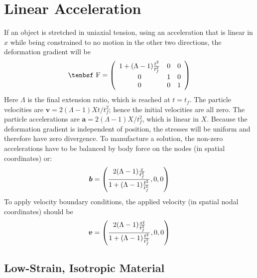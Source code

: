 \documentclass[11pt]{book}
\renewcommand{\vec}[1]{\boldsymbol{#1}}
\def\F{\hbox{\tenbsf F}}
\begin{document}
\section{Linear Acceleration}

If an object is stretched in uniaxial tension, using an acceleration that is linear in $x$ while being constrained to no motion in the other two directions, the deformation gradient will be
\begin{equation}
    \F = \left(\begin{array}{ccc} 1 + (\Lambda-1){t^2\over t_f^2} & 0 & 0 \\
               0 & 1 & 0 \\
               0 & 0 & 1 \end{array} \right)
\end{equation}
Here $\Lambda$ is the final extension ratio, which is reached at $t=t_f$. The particle velocities are $\vec v = 2(\Lambda-1)Xt/t_f^2$; hence the initial velocities are all zero. The particle accelerations are $\vec a = 2(\Lambda-1)X/t_f^2$, which is linear in $X$. Because the deformation gradient is independent of position, the stresses will be uniform and therefore have zero divergence. To manufacture a solution, the non-zero accelerations have to be balanced by body force on the nodes (in spatial coordinates) or:
\begin{equation}
    \vec b = \left({2(\Lambda-1){x\over t_f^2}\over 1+(\Lambda-1){t^2\over t_f^2}}, 0, 0\right)
\end{equation}
To apply velocity boundary conditions, the applied velocity (in spatial nodal coordinates) should be
\begin{equation}
     \vec v = \left({2(\Lambda-1){xt\over t_f^2}\over 1+ (\Lambda-1){t^2\over t_f^2}},0,0\right)
\end{equation}

\subsection{Low-Strain, Isotropic Material}
\end{document}
